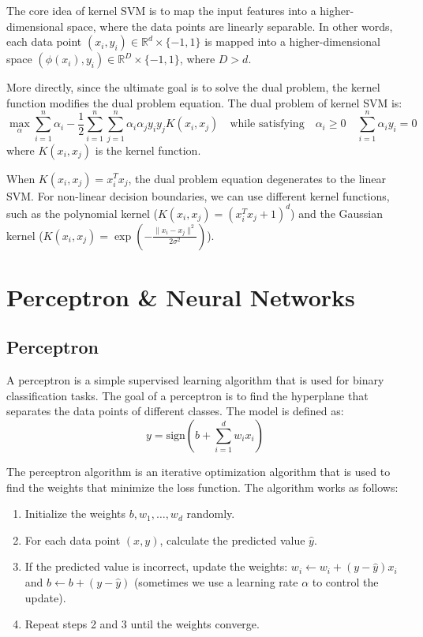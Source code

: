 \documentclass[a4paper,12pt]{article}
\begin{document}
The core idea of kernel SVM is to map the input features into a higher-dimensional space, where the data points are linearly separable. In other words, each data point $(x_i, y_i) \in \mathbb{R}^d \times \{-1, 1\}$ is mapped into a higher-dimensional space $(\phi(x_i), y_i) \in \mathbb{R}^D \times \{-1, 1\}$, where $D > d$.

More directly, since the ultimate goal is to solve the dual problem, the kernel function modifies the dual problem equation. The dual problem of kernel SVM is:
\begin{equation*}
  \max_{\alpha} \sum_{i=1}^{n} \alpha_i - \frac{1}{2} \sum_{i=1}^{n} \sum_{j=1}^{n} \alpha_i \alpha_j y_i y_j K(x_i, x_j) \quad \text{while satisfying} \quad \alpha_i \geq 0 \quad \sum_{i=1}^{n} \alpha_i y_i = 0
\end{equation*}
where $K(x_i, x_j)$ is the kernel function.

When $K(x_i, x_j) = x_i^T x_j$, the dual problem equation degenerates to the linear SVM. For non-linear decision boundaries, we can use different kernel functions, such as the polynomial kernel ($K(x_i, x_j) = (x_i^T x_j + 1)^d$) and the Gaussian kernel ($K(x_i, x_j) = \exp(-\frac{\|x_i - x_j\|^2}{2\sigma^2})$).

\section{Perceptron \& Neural Networks}

\subsection{Perceptron}

A perceptron is a simple supervised learning algorithm that is used for binary classification tasks. The goal of a perceptron is to find the hyperplane that separates the data points of different classes. The model is defined as:
\begin{equation*}
  y = \text{sign}(b + \sum_{i=1}^{d} w_i x_i)
\end{equation*}

The perceptron algorithm is an iterative optimization algorithm that is used to find the weights that minimize the loss function. The algorithm works as follows:
\begin{enumerate}
  \item Initialize the weights $b, w_1, \ldots, w_d$ randomly.
  \item For each data point $(x, y)$, calculate the predicted value $\hat{y}$.
  \item If the predicted value is incorrect, update the weights: $w_i \gets w_i + (y - \hat{y}) x_i$ and $b \gets b + (y - \hat{y})$ (sometimes we use a learning rate $\alpha$ to control the update).
  \item Repeat steps 2 and 3 until the weights converge.
\end{enumerate}
\end{document}

